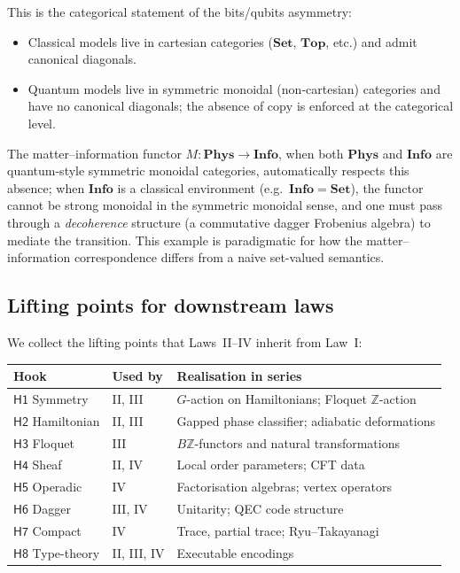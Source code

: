 \documentclass[12pt]{article}
\theoremstyle{definition}
\theoremstyle{remark}
\newcommand{\Phys}{\mathbf{Phys}}
\newcommand{\Info}{\mathbf{Info}}
\newcommand{\Set}{\mathbf{Set}}
\begin{document}
This is the categorical statement of the bits/qubits asymmetry:
\begin{itemize}
\item Classical models live in cartesian categories ($\Set$, $\mathbf{Top}$, etc.) and admit canonical diagonals.
\item Quantum models live in symmetric monoidal (non-cartesian) categories and have no canonical diagonals; the absence of $\mathrm{copy}$ is enforced at the categorical level.
\end{itemize}

The matter--information functor $M : \Phys \to \Info$, when both $\Phys$ and $\Info$ are quantum-style symmetric monoidal categories, automatically respects this absence; when $\Info$ is a classical environment (e.g.\ $\Info = \Set$), the functor cannot be strong monoidal in the symmetric monoidal sense, and one must pass through a \emph{decoherence} structure (a commutative dagger Frobenius algebra) to mediate the transition. This example is paradigmatic for how the matter--information correspondence differs from a naive set-valued semantics.

\subsection{Lifting points for downstream laws}

We collect the lifting points that Laws~II--IV inherit from Law~I:

\begin{center}
\begin{tabular}{lll}
\toprule
Hook & Used by & Realisation in series \\
\midrule
$\mathsf{H1}$ Symmetry & II, III & $G$-action on Hamiltonians; Floquet $\mathbb{Z}$-action \\
$\mathsf{H2}$ Hamiltonian & II, III & Gapped phase classifier; adiabatic deformations \\
$\mathsf{H3}$ Floquet & III & $B\mathbb{Z}$-functors and natural transformations \\
$\mathsf{H4}$ Sheaf & II, IV & Local order parameters; CFT data \\
$\mathsf{H5}$ Operadic & IV & Factorisation algebras; vertex operators \\
$\mathsf{H6}$ Dagger & III, IV & Unitarity; QEC code structure \\
$\mathsf{H7}$ Compact & IV & Trace, partial trace; Ryu--Takayanagi \\
$\mathsf{H8}$ Type-theory & II, III, IV & Executable encodings \\
\bottomrule
\end{tabular}
\end{center}
\end{document}
